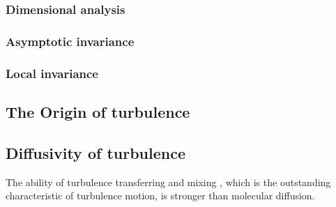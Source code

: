 \documentclass[review]{elsarticle}
\numberwithin{equation}{section}
\begin{document}
		\subsubsection {Dimensional analysis}
		\subsubsection {Asymptotic invariance}
		\subsubsection {Local invariance}
	\subsection{The Origin of turbulence}
	\subsection{Diffusivity of turbulence}
		The ability of turbulence transferring and mixing , which is the outstanding characteristic of turbulence motion, 
		is stronger than molecular diffusion.
\end{document}
